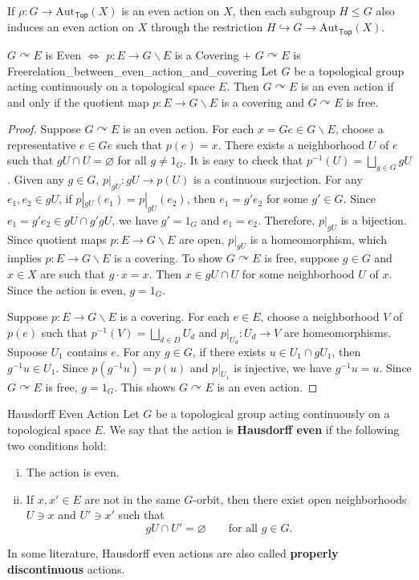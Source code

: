 \documentclass{report}
\def\acts{\curvearrowright}
\begin{document}
If $\rho:G\to \mathrm{Aut}_{\mathsf{Top}}(X)$ is an even action on $X$, then each subgroup $H\leq G$ also induces an even action on $X$ through the restriction $H\hookrightarrow G\to \mathrm{Aut}_{\mathsf{Top}}(X)$.

\begin{proposition}{$G \acts E$ is Even $\iff$ $p: E\to G\backslash E$ is a Covering + $G \acts E$ is Free}{relation_between_even_action_and_covering}
	Let $G$ be a topological group acting continuously on a topological space $E$. Then $G \acts E$ is an even action if and only if the quotient map $p: E\to G\backslash E$ is a covering and $G \acts E$ is free.
\end{proposition}

\begin{proof}
	Suppose $G \acts E$ is an even action. For each $x=Ge \in G \backslash E$, choose a representative $e \in Ge$ such that $p(e)=x$. There exists a neighborhood $U$ of $e$ such that $gU \cap U = \varnothing$ for all $g \neq 1_G$. It is easy to check that $p^{-1}(U)=\bigsqcup_{g\in G} gU$. Given any $g\in G$, $p|_{gU}: gU \to p(U)$ is a continuous surjection. For any $e_1,e_2\in gU$, if $p|_{gU}(e_1)=p|_{gU}(e_2)$, then $e_1=g'e_2$ for some $g'\in G$. Since $e_1=g'e_2\in gU \cap g'gU$, we have $g'=1_G$ and $e_1=e_2$. Therefore, $p|_{gU}$ is a bijection. Since quotient maps $p: E\to G\backslash E$ are open, $p|_{gU}$ is a homeomorphism, which implies $p: E\to G\backslash E$ is a covering. To show $G \acts E$ is free, suppose $g \in G$ and $x \in X$ are such that $g \cdot x=x$. Then $x \in g U \cap U$ for some neighborhood $U$ of $x$. Since the action is even, $g=1_G$.

	Suppose $p: E\to G\backslash E$ is a covering. For each $e\in E$, choose a neighborhood $V$ of $p(e)$ such that $p^{-1}\left(V\right)=\bigsqcup_{d\in D} U_d$ and $p|_{U_d}: U_d\to V$ are homeomorphisms. Supoose $U_1$ contains $e$. For any $g\in G$, if there exists $u \in U_1 \cap gU_1$, then $g^{-1}u \in U_1$. Since $p(g^{-1}u)=p(u)$ and $p|_{U_1}$ is injective, we have $g^{-1}u=u$. Since $G \acts E$ is free, $g=1_G$. This shows $G \acts E$ is an even action.
\end{proof}

\begin{definition}{Hausdorff Even Action}{}
Let $G$ be a topological group acting continuously on a topological space $E$. We say that the action is \textbf{Hausdorff even} if the following two conditions hold:
\begin{enumerate}[(i)]
    \item The action is even.
    \item If $x,x'\in E$ are not in the same $G$-orbit, then there exist open neighborhoods
    $U\ni x$ and $U'\ni x'$ such that
    \[
    gU\cap U'=\varnothing
    \qquad\text{for all }g\in G.
    \]
\end{enumerate}
\end{definition}
In some literature, Hausdorff even actions are also called \textbf{properly discontinuous} actions.
\end{document}
